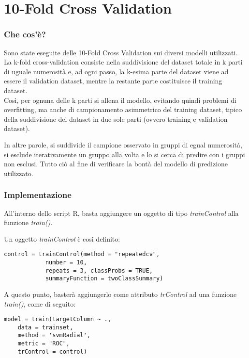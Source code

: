 \section{10-Fold Cross Validation}
\label{10fcv}
\subsubsection*{Che cos'è?}
Sono state eseguite delle 10-Fold Cross Validation sui diversi modelli utilizzati.\\
La k-fold cross-validation consiste nella suddivisione del dataset totale in k parti di uguale numerosità e, ad ogni passo, la k-esima parte del dataset viene ad essere il validation dataset, mentre la restante parte costituisce il training dataset. \\Così, per ognuna delle k parti si allena il modello, evitando quindi problemi di overfitting, ma anche di campionamento asimmetrico del training dataset, tipico della suddivisione del dataset in due sole parti (ovvero training e validation dataset).

\medskip
In altre parole, si suddivide il campione osservato in gruppi di egual numerosità, si esclude iterativamente un gruppo alla volta e lo si cerca di predire con i gruppi non esclusi. 
Tutto ciò al fine di verificare la bontà del modello di predizione utilizzato.

\subsubsection*{Implementazione}

All'interno dello script R, basta aggiungere un oggetto di tipo \textit{trainControl} alla funzione \textit{train()}.

Un oggetto \textit{trainControl} è cosi definito:

\begin{lstlisting}[caption=Definizione oggetto trainControl]
	control = trainControl(method = "repeatedcv", 
			number = 10, 
			repeats = 3, classProbs = TRUE, 
			summaryFunction = twoClassSummary)
\end{lstlisting}

A questo punto, basterà aggiungerlo come attributo \textit{trControl} ad una funzione \textit{train()}, come di seguito:

\begin{lstlisting}[caption=Training con train control]
model = train(targetColumn ~ ., 
	data = trainset, 
	method = 'svmRadial',
	metric = "ROC", 
	trControl = control)
\end{lstlisting}

